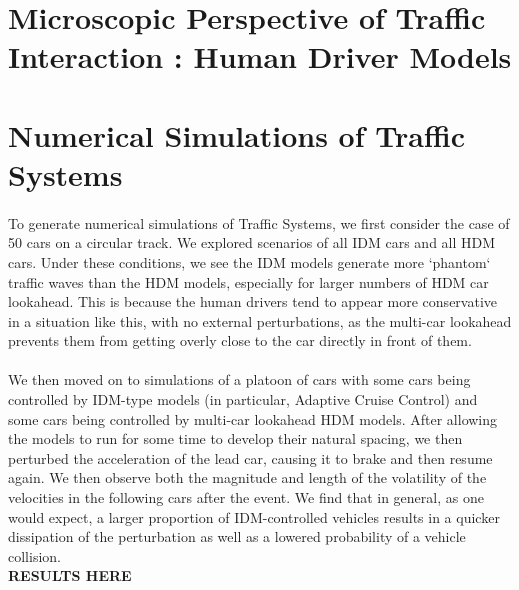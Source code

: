 \documentclass[11pt]{article}
\begin{document}
\section{Microscopic Perspective of Traffic Interaction : Human Driver Models}

\section{Numerical Simulations of Traffic Systems}

\paragraph{}To generate numerical simulations of Traffic Systems, we first consider the case of 50 cars on a circular track. We explored scenarios of all IDM cars and all HDM cars. Under these conditions, we see the IDM models generate more `phantom` traffic waves than the HDM models, especially for larger numbers of HDM car lookahead. This is because the human drivers tend to appear more conservative in a situation like this, with no external perturbations, as the multi-car lookahead prevents them from getting overly close to the car directly in front of them.



\paragraph{}We then moved on to simulations of a platoon of cars with some cars being controlled by IDM-type models (in particular, Adaptive Cruise Control) and some cars being controlled by multi-car lookahead HDM models. After allowing the models to run for some time to develop their natural spacing, we then perturbed the acceleration of the lead car, causing it to brake and then resume again. We then observe both the magnitude and length of the volatility of the velocities in the following cars after the event. We find that in general, as one would expect, a larger proportion of IDM-controlled vehicles results in a quicker dissipation of the perturbation as well as a lowered probability of a vehicle collision.\\
\textbf{RESULTS HERE}
\end{document}
